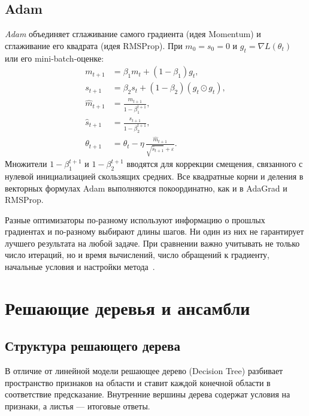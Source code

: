 \documentclass[12pt,a4paper]{article}
\begin{document}
\subsection{Adam}

\emph{Adam} объединяет сглаживание самого градиента (идея Momentum)
и сглаживание его квадрата (идея RMSProp). При $m_0=s_0=0$
и $g_t=\nabla L(\theta_t)$ или его mini-batch-оценке:
\begin{equation}
    \begin{aligned}
       m_{t+1}&=\beta_1m_t+(1-\beta_1)g_t,\\
       s_{t+1}&=\beta_2s_t+(1-\beta_2)(g_t\odot g_t),\\
       \widehat m_{t+1}&=\frac{m_{t+1}}{1-\beta_1^{t+1}},\\
       \widehat s_{t+1}&=\frac{s_{t+1}}{1-\beta_2^{t+1}},\\
       \theta_{t+1}&=\theta_t-
           \eta\,\frac{\widehat m_{t+1}}
           {\sqrt{\widehat s_{t+1}}+\varepsilon}.
    \end{aligned}
    \label{eq:adam}
\end{equation}
Множители $1-\beta_1^{t+1}$ и $1-\beta_2^{t+1}$
вводятся для коррекции смещения, связанного с нулевой
инициализацией скользящих средних.
Все квадратные корни и деления в векторных формулах Adam
выполняются покоординатно, как и в AdaGrad и RMSProp.

Разные оптимизаторы по-разному используют информацию
о прошлых градиентах и по-разному выбирают длины шагов.
Ни один из них не гарантирует лучшего результата на любой задаче.
При сравнении важно учитывать не только число итераций,
но и время вычислений, число обращений к градиенту,
начальные условия и настройки метода~\cite{d2l-opt}.

\section{Решающие деревья и ансамбли}

\subsection{Структура решающего дерева}

В отличие от линейной модели решающее дерево (Decision Tree)
разбивает пространство признаков на области и ставит
каждой конечной области в соответствие предсказание.
Внутренние вершины дерева содержат условия на признаки,
а листья --- итоговые ответы.
\end{document}
